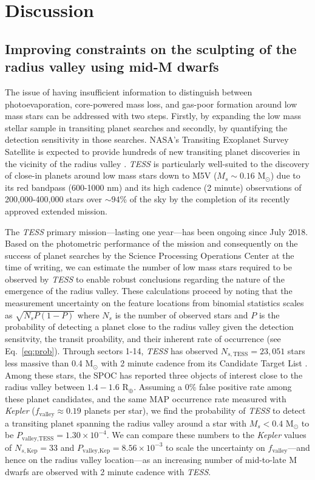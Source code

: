 \documentclass[twocolumn]{emulateapj}
\newcommand{\kepler}[1]{\emph{Kepler}#1}
\newcommand{\tess}[1]{\emph{TESS}#1}
\begin{document}
\section{Discussion} \label{sect:discussion}
\subsection{Improving constraints on the sculpting of the radius valley using mid-M dwarfs} \label{sect:improve}
The issue of having insufficient information to distinguish between photoevaporation, core-powered mass loss, and gas-poor
formation around low mass stars can be addressed with two steps. Firstly, by expanding the low mass stellar sample in 
transiting planet searches and secondly, by quantifying the detection sensitivity in those searches. 
NASA's Transiting Exoplanet Survey Satellite \citep[\tess{;}][]{ricker15} is expected to provide hundreds of new transiting
planet discoveries in the vicinity of the radius valley \citep{barclay18}. \tess{} is particularly well-suited to the discovery of
close-in planets around low mass stars down to M5V ($M_s\sim 0.16$ M$_{\odot}$) due to its red bandpass (600-1000 nm)
and its high cadence (2 minute) observations of 200,000-400,000 stars over $\sim 94$\% of the sky by the completion of its
recently approved extended mission.

The \tess{} primary mission---lasting one year---has been ongoing since July 2018. 
Based on the photometric performance of the mission and consequently on the success of planet searches by the
Science Processing Operations Center \citep[SPOC;][]{jenkins16,twicken18,li18} at the time of writing,
we can estimate the number of low mass stars required to be observed
by \tess{} to enable robust conclusions regarding the nature of the emergence of the radius valley. These calculations
proceed by noting that the measurement uncertainty on the feature locations from binomial statistics scales as
$\sqrt{N_sP(1-P)}$ where $N_s$ is the number of observed stars and $P$ is the probability of detecting a planet close to
the radius valley 
given the detection sensitvity, the transit proability, and their inherent rate of occurrence (see Eq.~\ref{eq:prob}).
Through sectors 1-14, \tess{} has observed $N_{s,\text{TESS}} = 23,051$ stars less massive than 0.4 M$_{\odot}$
with 2 minute cadence from its Candidate Target List \citep[CTL;][]{stassun19}.
Among these stars, the SPOC has reported three objects of interest close to the radius valley
between $1.4-1.6$ R$_{\oplus}$. Assuming a 0\% false positive rate
among these planet candidates, and the same MAP occurrence rate measured with \kepler{}
($f_{\text{valley}}\approx 0.19$ planets per star), we find the probability of \tess{} to detect a transiting planet
spanning the radius valley around a star with $M_s<0.4$ M$_{\odot}$ to be 
$P_{\text{valley,TESS}}=1.30 \times 10^{-4}$. We can compare these numbers to the \kepler{} values of $N_{s,\text{Kep}}=33$ and
$P_{\text{valley,Kep}}=8.56\times 10^{-3}$ to scale the uncertainty on $f_{\text{valley}}$---and hence on the radius
valley location---as an increasing number of mid-to-late M dwarfs are observed with 2 minute cadence with \tess{.}
\end{document}

